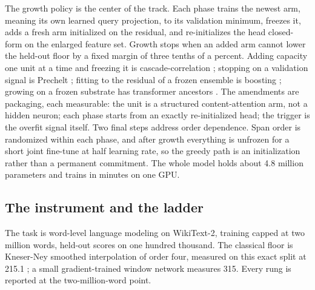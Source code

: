 \documentclass[11pt]{article}
\begin{document}
The growth policy is the center of the track. Each phase trains the
newest arm, meaning its own learned query projection, to its
validation minimum, freezes it, adds a fresh arm initialized on the
residual, and re-initializes the head closed-form on the enlarged
feature set. Growth stops when an added arm cannot lower the
held-out floor by a fixed margin of three tenths of a percent.
Adding capacity one unit at a time and freezing it is
cascade-correlation \cite{fahlman1990}; stopping on a validation
signal is Prechelt \cite{prechelt1998}; fitting to the residual of
a frozen ensemble is boosting \cite{friedman2001}; growing on a
frozen substrate has transformer ancestors \cite{growing2025}. The
amendments are packaging, each measurable: the unit is a structured
content-attention arm, not a hidden neuron; each phase starts from
an exactly re-initialized head; the trigger is the overfit signal
itself. Two final steps address order dependence. Span order is
randomized within each phase, and after growth everything is
unfrozen for a short joint fine-tune at half learning rate, so the
greedy path is an initialization rather than a permanent
commitment. The whole model holds about 4.8 million parameters and
trains in minutes on one GPU.

\subsection{The instrument and the ladder}

The task is word-level language modeling on WikiText-2, training
capped at two million words, held-out scores on one hundred
thousand. The classical floor is Kneser-Ney smoothed interpolation
of order four, measured on this exact split at 215.1
\cite{kneser1995}; a small gradient-trained window network measures
315. Every rung is reported at the two-million-word point.
\end{document}
